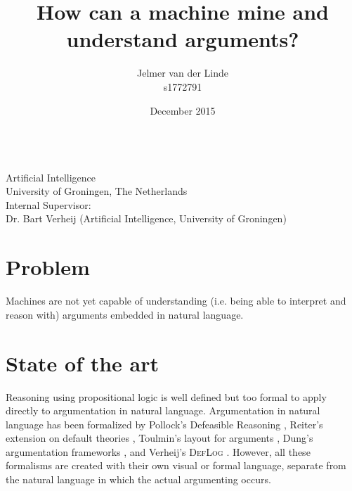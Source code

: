 \documentclass[a4paper]{article}
\begin{document}
\title{How can a machine mine and understand arguments?}
\author{Jelmer van der Linde\\s1772791}
\date{December 2015}

\begingroup

\maketitle
{}

\vspace*{250pt}
\\
Artificial Intelligence\\
University of Groningen, The Netherlands\\[\baselineskip]
Internal Supervisor:\\
Dr. Bart Verheij (Artificial Intelligence, University of Groningen)

\endgroup

\newpage

\section*{Problem}
Machines are not yet capable of understanding (i.e. being able to interpret and reason with) arguments embedded in natural language.

\section*{State of the art}
Reasoning using propositional logic is well defined but too formal to apply directly to argumentation in natural language. Argumentation in natural language has been formalized by Pollock's Defeasible Reasoning \cite{Pollock:1987defeasible}, Reiter's extension on default theories \cite{Reiter:1980ix}, Toulmin's layout for arguments \cite{Toulmin:2003uses}, Dung's argumentation frameworks \cite{Dung:1995dsa}, and Verheij's \textsc{DefLog} \cite{Verheij:2003gx}. However, all these formalisms are created with their own visual or formal language, separate from the natural language in which the actual argumenting occurs.
\end{document}

